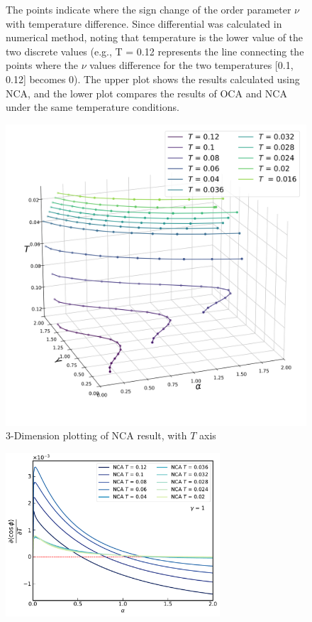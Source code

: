 \documentclass{article}
\begin{document}
\begin{spacing}{1.3}
\begin{figure}[H]
  \caption{The points indicate where the sign change of the order parameter $\nu$ with temperature difference. Since differential was calculated in numerical method, noting that temperature is the lower value of the two discrete values 
  (e.g., T = 0.12 represents the line connecting the points where the $\nu$ values 
  difference for the two temperatures [0.1, 0.12] becomes 0). The upper plot shows the results calculated using NCA, 
  and the lower plot compares the results of OCA and NCA under the same temperature conditions.}
   \label{2Dplot}
\end{figure}
\begin{figure}[H]
  \centerline{\includegraphics[width=12cm]{TexFigure/4/4_3_10_3dplot_Ns3_proj_20-1.png}}
  \caption{3-Dimension plotting of NCA result, with $T$ axis}%
\end{figure}
\pagebreak
\begin{figure}[H]
  \vfill
  \centering
  \centerline{\includegraphics[width=8cm]{TexFigure/4/4_3_11_0.pdf}}

\end{figure}
\end{spacing}
\end{document}
